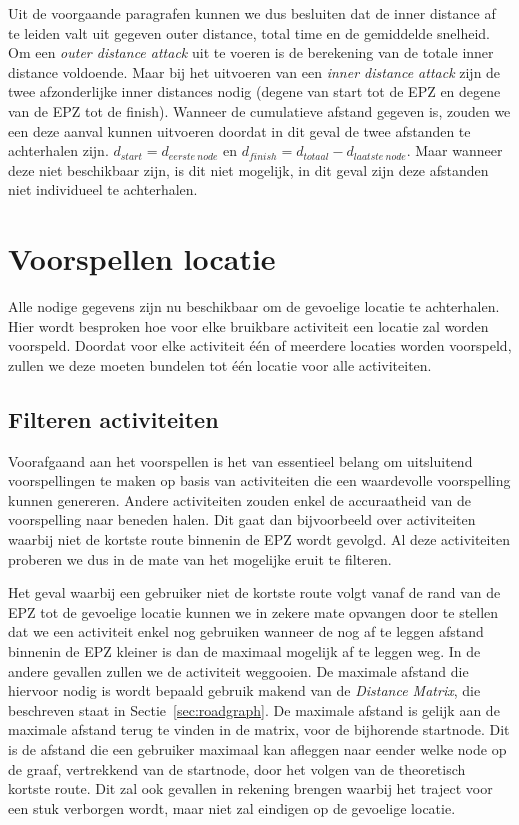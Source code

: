 Uit de voorgaande paragrafen kunnen we dus besluiten dat de inner distance af
te leiden valt uit gegeven outer distance, total time en de gemiddelde
snelheid. Om een \textit{outer distance attack} uit te voeren is de berekening
van de totale inner distance voldoende. Maar bij het uitvoeren van een
\textit{inner distance attack} zijn de twee afzonderlijke inner distances nodig
(degene van start tot de \ac{EPZ} en degene van de \ac{EPZ} tot de finish).
Wanneer de cumulatieve afstand gegeven is, zouden we een deze aanval kunnen
uitvoeren doordat in dit geval de twee afstanden te achterhalen zijn.
$d_{start} = d_{eerste\ node}$ en $d_{finish} = d_{totaal} - d_{laatste\
            node}$. Maar wanneer deze niet beschikbaar zijn, is dit niet mogelijk, in dit
geval zijn deze afstanden niet individueel te achterhalen.

\section{Voorspellen locatie}
Alle nodige gegevens zijn nu beschikbaar om de gevoelige locatie te
achterhalen. Hier wordt besproken hoe voor elke bruikbare activiteit een
locatie zal worden voorspeld. Doordat voor elke activiteit één of meerdere
locaties worden voorspeld, zullen we deze moeten bundelen tot één locatie voor
alle activiteiten.

\subsection{Filteren activiteiten}
Voorafgaand aan het voorspellen is het van essentieel belang om uitsluitend
voorspellingen te maken op basis van activiteiten die een waardevolle
voorspelling kunnen genereren. Andere activiteiten zouden enkel de accuraatheid
van de voorspelling naar beneden halen. Dit gaat dan bijvoorbeeld over
activiteiten waarbij niet de kortste route binnenin de \ac{EPZ} wordt gevolgd.
Al deze activiteiten proberen we dus in de mate van het mogelijke eruit te
filteren.

Het geval waarbij een gebruiker niet de kortste route volgt vanaf de rand van
de \ac{EPZ} tot de gevoelige locatie kunnen we in zekere mate opvangen door te
stellen dat we een activiteit enkel nog gebruiken wanneer de nog af te leggen
afstand binnenin de \ac{EPZ} kleiner is dan de maximaal mogelijk af te leggen
weg. In de andere gevallen zullen we de activiteit weggooien. De maximale
afstand die hiervoor nodig is wordt bepaald gebruik makend van de
\textit{Distance Matrix}, die beschreven staat in Sectie~\ref{sec:roadgraph}.
De maximale afstand is gelijk aan de maximale afstand terug te vinden in de
matrix, voor de bijhorende startnode. Dit is de afstand die een gebruiker
maximaal kan afleggen naar eender welke node op de graaf, vertrekkend van de
startnode, door het volgen van de theoretisch kortste route. Dit zal ook
gevallen in rekening brengen waarbij het traject voor een stuk verborgen wordt,
maar niet zal eindigen op de gevoelige locatie.

